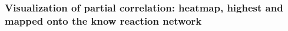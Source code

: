 \documentclass[11pt]{article}
\begin{document}
    \begin{center}
    \end{center}
    { \hspace*{\fill} \\}
    
    \begin{center}
    \end{center}
    { \hspace*{\fill} \\}
    
    \subsubsection{Visualization of partial correlation: heatmap, highest
and mapped onto the know reaction
network}\label{visualization-of-partial-correlation-heatmap-highest-and-mapped-onto-the-know-reaction-network}
\end{document}
